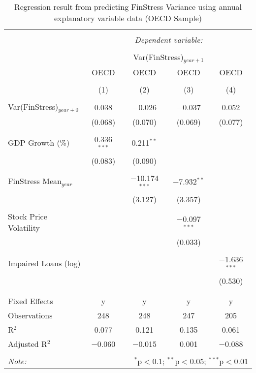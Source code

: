 
\begin{table}[!htbp] \centering 
  \caption{Regression result from predicting FinStress Variance using annual explanatory variable data (OECD Sample)} 
  \label{annual_reg} 
\tiny 
\begin{tabular}{@{\extracolsep{5pt}}lcccc} 
\\[-1.8ex]\hline 
\hline \\[-1.8ex] 
 & \multicolumn{4}{c}{\textit{Dependent variable:}} \\ 
\cline{2-5} 
\\[-1.8ex] & \multicolumn{4}{c}{Var(FinStress)$_{year+1}$} \\ 
 & OECD & OECD & OECD & OECD \\ 
\\[-1.8ex] & (1) & (2) & (3) & (4)\\ 
\hline \\[-1.8ex] 
 Var(FinStress)$_{year+0}$ & 0.038 & $-$0.026 & $-$0.037 & 0.052 \\ 
  & (0.068) & (0.070) & (0.069) & (0.077) \\ 
  & & & & \\ 
 GDP Growth (\%) & 0.336$^{***}$ & 0.211$^{**}$ &  &  \\ 
  & (0.083) & (0.090) &  &  \\ 
  & & & & \\ 
 FinStress Mean$_{year}$ &  & $-$10.174$^{***}$ & $-$7.932$^{**}$ &  \\ 
  &  & (3.127) & (3.357) &  \\ 
  & & & & \\ 
 Stock Price Volatility &  &  & $-$0.097$^{***}$ &  \\ 
  &  &  & (0.033) &  \\ 
  & & & & \\ 
 Impaired Loans (log) &  &  &  & $-$1.636$^{***}$ \\ 
  &  &  &  & (0.530) \\ 
  & & & & \\ 
\hline \\[-1.8ex] 
Fixed Effects & y & y & y & y \\ 
Observations & 248 & 248 & 247 & 205 \\ 
R$^{2}$ & 0.077 & 0.121 & 0.135 & 0.061 \\ 
Adjusted R$^{2}$ & $-$0.060 & $-$0.015 & 0.001 & $-$0.088 \\ 
\hline 
\hline \\[-1.8ex] 
\textit{Note:}  & \multicolumn{4}{r}{$^{*}$p$<$0.1; $^{**}$p$<$0.05; $^{***}$p$<$0.01} \\ 
\end{tabular} 
\end{table} 
